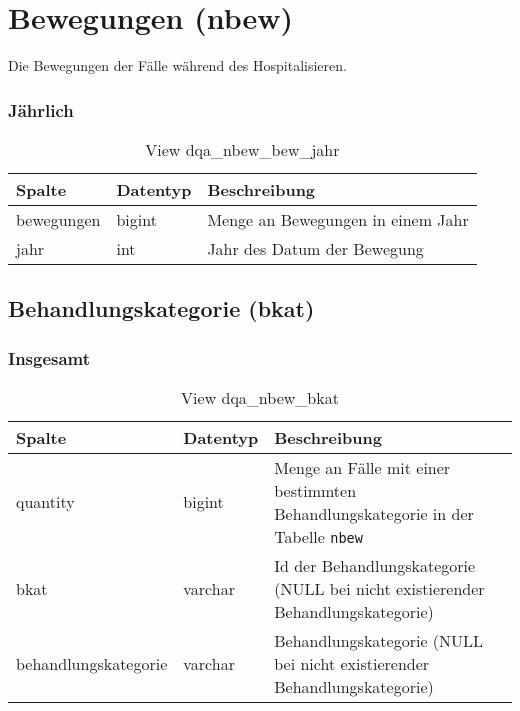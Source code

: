 \section{Bewegungen (nbew)} \label{sec:beweg}

Die Bewegungen der Fälle während des Hospitalisieren.

\subsubsection{Jährlich} \label{subsubsec:bewJahr}

\clearpage

\begin{table}[ht]
	\centering   
	\caption{View dqa\_nbew\_bew\_jahr}
	\label{tab:beweJahr}
	\begin{tabular}{||l|l|p{10cm}||}   		
		\hline
		Spalte & Datentyp & Beschreibung \\ [0.5ex]
		\hline\hline
		bewegungen & bigint & Menge an Bewegungen in einem Jahr\\
		\hline
		jahr & int &  Jahr des Datum der Bewegung \\
		\hline
		
	\end{tabular}
\end{table}


\subsection{Behandlungskategorie (bkat)} \label{subsec:behKat}

\subsubsection{Insgesamt} \label{subsubsec:behKatI}

\begin{table}[ht]
	\centering   
	\caption{View dqa\_nbew\_bkat}
	\label{tab:beweBkatAll}
	\begin{tabular}{||l|l|p{10cm}||}   		
		\hline
		Spalte & Datentyp & Beschreibung \\ [0.5ex]
		\hline\hline
		quantity & bigint & Menge an Fälle mit einer bestimmten Behandlungskategorie in der Tabelle \texttt{nbew} \\
		\hline
		bkat & varchar & Id der Behandlungskategorie (NULL bei nicht existierender Behandlungskategorie)\\
		\hline
		behandlungskategorie & varchar & Behandlungskategorie (NULL bei nicht existierender Behandlungskategorie)\\
		\hline
		
	\end{tabular}
\end{table}

